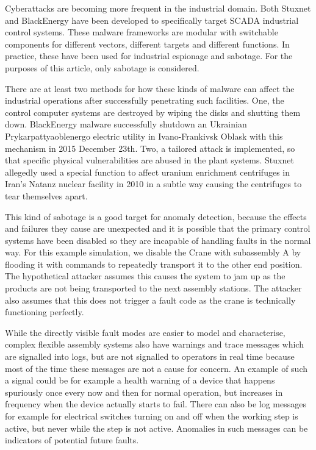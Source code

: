\documentclass[journal]{IEEEtran}
\begin{document}
Cyberattacks are becoming more frequent in the industrial domain. Both Stuxnet and BlackEnergy have been developed to specifically target SCADA industrial control systems.
These malware frameworks are modular with switchable components for different vectors, different targets and different functions.
In practice, these have been used for industrial espionage and sabotage. For the purposes of this article, only sabotage is considered.

There are at least two methods for how these kinds of malware can affect the industrial operations
after successfully penetrating such facilities. One, the control computer systems are destroyed by wiping the disks and shutting them down. BlackEnergy malware
successfully shutdown an Ukrainian Prykarpattyaoblenergo electric utility in Ivano-Frankivsk Oblask with this mechanism in 2015 December 23th.
Two, a tailored attack is implemented, so that specific physical vulnerabilities are abused in the plant systems. Stuxnet allegedly used a special function
to affect uranium enrichment centrifuges in Iran’s Natanz nuclear facility in 2010 in a subtle way causing the centrifuges to tear themselves apart.

This kind of sabotage is a good target for anomaly detection, because the effects and failures they cause are unexpected and it is possible that the primary control systems
have been disabled so they are incapable of handling faults in the normal way. For this example simulation, we disable the Crane with subassembly A by flooding it with commands
to repeatedly transport it to the other end position. The hypothetical attacker assumes this causes the system to jam up as the products are not being transported to the next
assembly stations. The attacker also assumes that this does not trigger a fault code as the crane is technically functioning perfectly.

While the directly visible fault modes are easier to model and characterise, complex flexible assembly systems also have warnings and trace messages
which are signalled into logs, but are not signalled to operators in real time because most of the time these messages are not a cause for concern.
An example of such a signal could be for example a health warning of a device that happens spuriously once every now and then for normal operation,
but increases in frequency when the device actually starts to fail. There can also be log messages for example for electrical switches turning
on and off when the working step is active, but never while the step is not active. Anomalies in such messages can be indicators of potential
future faults.
\end{document}
